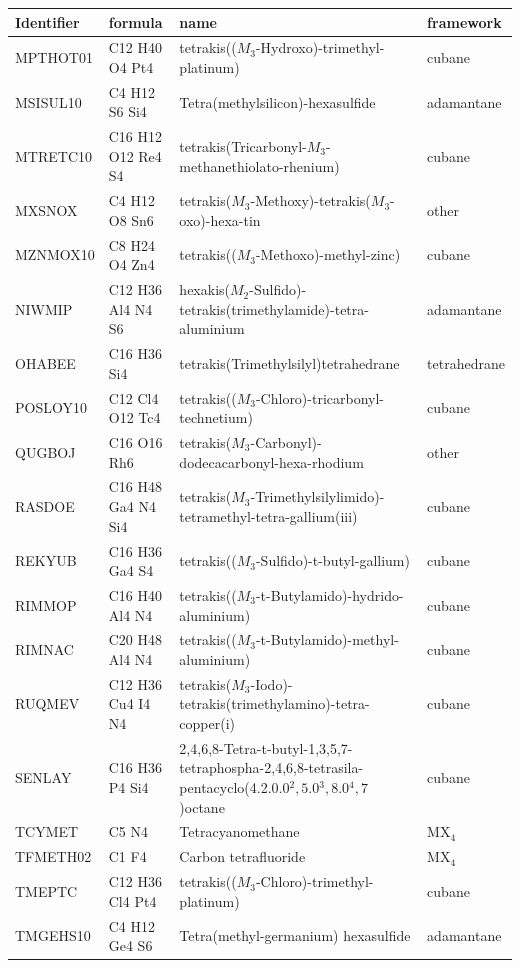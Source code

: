 \documentclass[preprint]{revtex4}              %
\begin{document}
\begin{landscape}
\begin{table} \tiny
\begin{tabular}{llll}
Identifier & formula & name & framework\\
\hline
MPTHOT01 & C12 H40 O4 Pt4 & tetrakis(($M_3$-Hydroxo)-trimethyl-platinum) & cubane \\
MSISUL10 & C4 H12 S6 Si4 & Tetra(methylsilicon)-hexasulfide & adamantane\\
MTRETC10 & C16 H12 O12 Re4 S4 & tetrakis(Tricarbonyl-$M_3$-methanethiolato-rhenium) & cubane\\
MXSNOX & C4 H12 O8 Sn6 & tetrakis($M_3$-Methoxy)-tetrakis($M_3$-oxo)-hexa-tin & other\\
MZNMOX10 & C8 H24 O4 Zn4 & tetrakis(($M_3$-Methoxo)-methyl-zinc) & cubane\\
NIWMIP & C12 H36 Al4 N4 S6 & hexakis($M_2$-Sulfido)-tetrakis(trimethylamide)-tetra-aluminium & adamantane\\
OHABEE & C16 H36 Si4 & tetrakis(Trimethylsilyl)tetrahedrane & tetrahedrane\\
POSLOY10 & C12 Cl4 O12 Tc4 & tetrakis(($M_3$-Chloro)-tricarbonyl-technetium) & cubane\\
QUGBOJ & C16 O16 Rh6 & tetrakis($M_3$-Carbonyl)-dodecacarbonyl-hexa-rhodium & other\\
RASDOE & C16 H48 Ga4 N4 Si4 & tetrakis($M_3$-Trimethylsilylimido)-tetramethyl-tetra-gallium(iii) & cubane\\
REKYUB & C16 H36 Ga4 S4 & tetrakis(($M_3$-Sulfido)-t-butyl-gallium) & cubane\\
RIMMOP & C16 H40 Al4 N4 & tetrakis(($M_3$-t-Butylamido)-hydrido-aluminium) & cubane\\
RIMNAC & C20 H48 Al4 N4 & tetrakis(($M_3$-t-Butylamido)-methyl-aluminium) & cubane\\
RUQMEV & C12 H36 Cu4 I4 N4 & tetrakis($M_3$-Iodo)-tetrakis(trimethylamino)-tetra-copper(i) & cubane\\
SENLAY & C16 H36 P4 Si4 & 2,4,6,8-Tetra-t-butyl-1,3,5,7-tetraphospha-2,4,6,8-tetrasila-pentacyclo(4.2.0.0$^2,5$.0$^3,8$.0$^4,7$)octane & cubane\\
TCYMET & C5 N4 & Tetracyanomethane & MX$_4$\\
TFMETH02 & C1 F4 & Carbon tetrafluoride & MX$_4$\\
TMEPTC & C12 H36 Cl4 Pt4 & tetrakis(($M_3$-Chloro)-trimethyl-platinum) & cubane\\
TMGEHS10 & C4 H12 Ge4 S6 & Tetra(methyl-germanium) hexasulfide & adamantane\\

\end{tabular}
\end{table}
\end{landscape}
\end{document}

